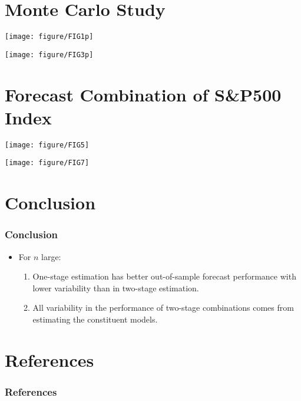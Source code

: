 \documentclass[aspectratio=169]{beamer}
\begin{document}
\section{Monte Carlo Study}

\begin{frame}[plain]
\begin{center}
\texttt{[image: figure/FIG1p]}
\end{center}
\end{frame}

\begin{frame}[plain]
\begin{center}
\texttt{[image: figure/FIG3p]}
\end{center}
\end{frame}

\section{Forecast Combination of S\&P500 Index}

\begin{frame}[plain]
\begin{center}
\texttt{[image: figure/FIG5]}
\end{center}
\end{frame}

\begin{frame}[plain]
\begin{center}
\texttt{[image: figure/FIG7]}
\end{center}
\end{frame}

\section{Conclusion}

\begin{frame}
\frametitle{Conclusion}
\begin{itemize}
\item<1-> For $n$ large:
\vspace{\negspace}
\begin{enumerate}
\item<2-> One-stage estimation has better out-of-sample forecast performance with lower variability than in two-stage estimation.
\vspace{\negspace}
\item<3-> All variability in the performance of two-stage combinations comes from estimating the constituent models.
\end{enumerate}
\end{itemize}
\end{frame}

\section{References}
\begin{frame}[allowframebreaks]
\frametitle{References}

\end{frame}
\end{document}
